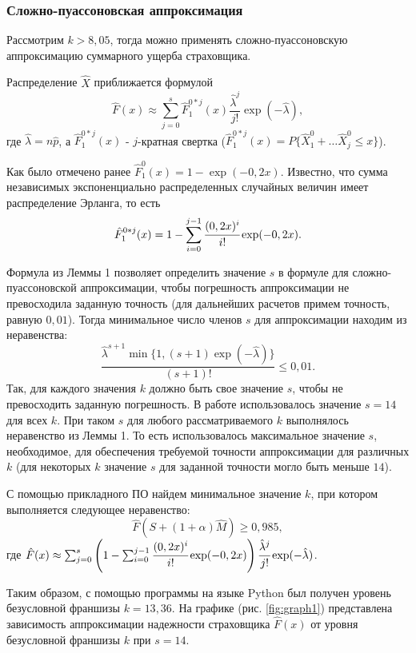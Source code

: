 \documentclass[a4paper,12pt]{article}
\begin{document}
\subsubsection{Сложно-пуассоновская аппроксимация}
Рассмотрим $k > 8,05$, тогда можно применять сложно-пуассоновскую аппроксимацию суммарного ущерба страховщика. 

Распределение $\hat{X}$ приближается формулой 
\[\hat{F}(x) \approx \sum_{j = 0}^{s} \hat{F}_1^{0 * j}(x) \frac{\hat{\lambda}^j}{j!}\exp (-\hat{\lambda}),\]
где $\hat{\lambda} = n\hat{p}$, а $\hat{F}_1^{0 * j}(x)$ - $j$-кратная свертка ($\hat{F}_1^{0 * j}(x) = P\{\hat{X}_1^0 + \dots \hat{X}_j^0 \le x\}$).

Как было отмечено ранее $\hat{F}_1^0(x) = 1 - \exp(-0,2 x)$. Известно, что сумма независимых экспоненциально распределенных случайных величин имеет распределение Эрланга, то есть
\[\hat{F}_1^{0 * j}(x) = 1 - \sum_{i = 0}^{j - 1} \cfrac{(0,2 x)^i}{i!} \exp(-0,2x).\]

Формула из Леммы 1 позволяет определить значение $s$ в формуле для сложно-пуассоновской аппроксимации, чтобы погрешность аппроксимации не превосходила заданную точность (для дальнейших расчетов примем точность, равную $0,01$). Тогда минимальное число членов $s$ для аппроксимации находим из неравенства:
\[\frac{\hat{\lambda}^{s + 1} \min\{1, (s + 1)\exp(-\hat{\lambda})\}}{(s + 1)!} \le 0,01.\]
Так, для каждого значения $k$ должно быть свое значение $s$, чтобы не превосходить заданную погрешность. В работе использовалось значение $s = 14$ для всех $k$. При таком $s$ для любого рассматриваемого $k$ выполнялось неравенство из Леммы 1. То есть использовалось максимальное значение $s$, необходимое, для обеспечения требуемой точности аппроксимации для различных $k$ (для некоторых $k$ значение $s$ для заданной точности могло быть меньше $14$).

С помощью прикладного ПО найдем минимальное значение $k$, при котором выполняется следующее неравенство:
\[\hat{F}(S + (1 + \alpha)\hat{M}) \ge 0,985,\]
где $\hat{F}(x) \approx \sum_{j = 0}^{s} \left(1 - \sum_{i = 0}^{j - 1} \cfrac{(0,2 x)^i}{i!} \exp(-0,2x)\right) \cfrac{\hat{\lambda}^j}{j!}\exp (-\hat{\lambda})$.

Таким образом, с помощью программы на языке Python был получен уровень безусловной франшизы $k=13,36$. На графике (рис. \ref{fig:graph1}) представлена зависимость аппроксимации надежности страховщика $\hat{F}(x)$ от уровня безусловной франшизы $k$ при $s = 14$.
\end{document}
